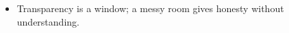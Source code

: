 \begin{itemize}
    \item Transparency is a window; a messy room gives honesty without understanding. 

\end{itemize}

